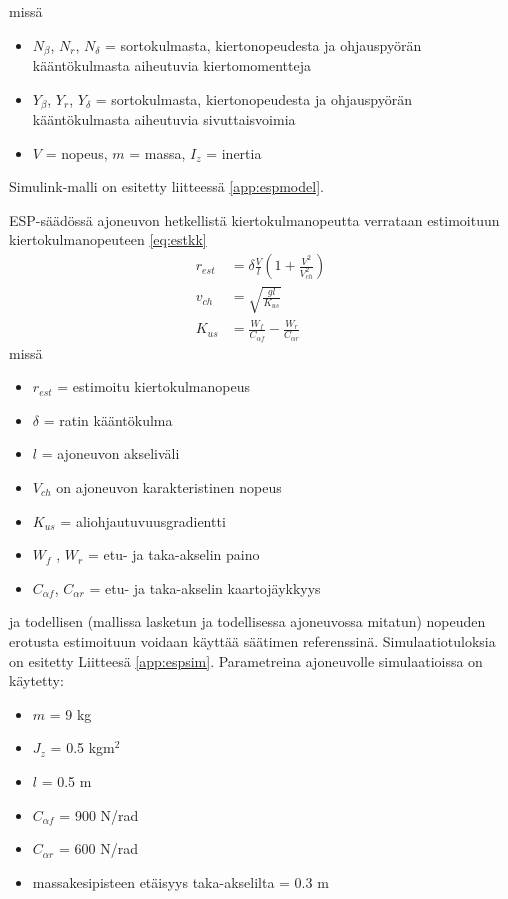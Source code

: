 \documentclass{article}
\begin{document}
missä

\begin{itemize}
	\item $N_\beta$, $N_r$, $N_\delta$ = sortokulmasta, kiertonopeudesta ja ohjauspyörän kääntökulmasta aiheutuvia kiertomomentteja
	\item $Y_\beta$, $Y_r$, $Y_\delta$ = sortokulmasta, kiertonopeudesta ja ohjauspyörän kääntökulmasta aiheutuvia sivuttaisvoimia
	\item $V$ = nopeus, $m$ = massa, $I_z$ = inertia
\end{itemize}

Simulink-malli on esitetty liitteessä \ref{app:espmodel}.

ESP-säädössä ajoneuvon hetkellistä kiertokulmanopeutta verrataan estimoituun kiertokulmanopeuteen \ref{eq:estkk}
\begin{equation} \label{eq:estkk}
\begin{split}
r_{est} &= \delta \frac{V}{l} (1 + \frac{V^2}{V_{ch}^2}) \\
v_{ch} &= \sqrt{\frac{gl}{K_{us}}} \\
K_{us} &= \frac{W_f}{C_{\alpha f}}-\frac{W_r}{C_{\alpha r}}
\end{split}
\end{equation}
missä
\begin{itemize}
	\item $r_{est}$ = estimoitu kiertokulmanopeus
	\item $\delta$ = ratin kääntökulma
	\item $l$ = ajoneuvon akseliväli
	\item $V_{ch}$ on ajoneuvon karakteristinen nopeus
	\item $K_{us}$ = aliohjautuvuusgradientti
	\item $W_f$ , $W_r$ = etu- ja taka-akselin paino
	\item $C_{\alpha f}$, $C_{\alpha r}$ = etu- ja taka-akselin kaartojäykkyys
\end{itemize}
ja todellisen (mallissa lasketun ja todellisessa ajoneuvossa mitatun) nopeuden erotusta estimoituun voidaan käyttää säätimen referenssinä. Simulaatiotuloksia on esitetty Liitteesä \ref{app:espsim}. Parametreina ajoneuvolle simulaatioissa on käytetty:
\begin{itemize}
\item $m$ = 9 kg
\item $J_z$ = 0.5 kgm$^2$
\item $l$ = 0.5 m
\item $C_{\alpha f}$ = 900 N/rad
\item $C_{\alpha r}$ = 600 N/rad
\item massakesipisteen etäisyys taka-akselilta = 0.3 m
\end{itemize}
\end{document}
